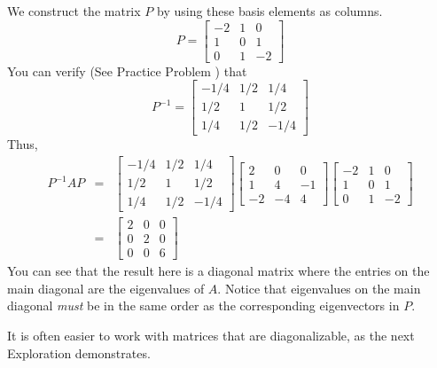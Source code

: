 \documentclass{ximera}
\begin{document}
\begin{example}
\begin{explanation}
We construct the matrix $P$ by using these basis elements as columns.
\begin{equation*}
P=\begin{bmatrix}
-2 & 1 & 0 \\
1 & 0 & 1 \\
0 & 1 & -2
\end{bmatrix}
\end{equation*}
You can verify (See Practice Problem ) that
\begin{equation*}
P^{-1}=\begin{bmatrix}
-1/4 & 1/2 & 1/4 \\
1/2 & 1 & 1/2 \\
1/4 & 1/2 & -1/4
\end{bmatrix}
\end{equation*}
Thus,
\begin{eqnarray*}
P^{-1}AP &=&\begin{bmatrix}
-1/4 & 1/2 & 1/4 \\
1/2 & 1 & 1/2 \\
1/4 & 1/2 & -1/4
\end{bmatrix} \begin{bmatrix}
2 & 0 & 0 \\
1 & 4 & -1 \\
-2 & -4 & 4
\end{bmatrix} \begin{bmatrix}
-2 & 1 & 0 \\
1 & 0 & 1 \\
0 & 1 & -2
\end{bmatrix} \\
&=&\begin{bmatrix}
2 & 0 & 0 \\
0 & 2 & 0 \\
0 & 0 & 6
\end{bmatrix}
\end{eqnarray*}
You can see that the result here is a diagonal matrix where the entries on the main diagonal are the eigenvalues of $A$. Notice that eigenvalues on the main diagonal {\it must} be in the same order as the corresponding eigenvectors in $P$.
\end{explanation}
\end{example}

It is often easier to work with matrices that are diagonalizable, as the next Exploration demonstrates.  
\end{document}
